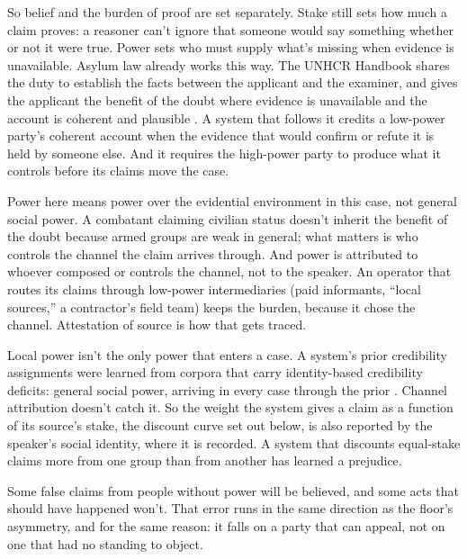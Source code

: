 So belief and the burden of proof are set separately. Stake still sets how much a claim proves: a reasoner can't ignore that someone would say something whether or not it were true. Power sets who must supply what's missing when evidence is unavailable. Asylum law already works this way. The UNHCR Handbook shares the duty to establish the facts between the applicant and the examiner, and gives the applicant the benefit of the doubt where evidence is unavailable and the account is coherent and plausible \autocite{unhcr1979handbook}. A system that follows it credits a low-power party's coherent account when the evidence that would confirm or refute it is held by someone else. And it requires the high-power party to produce what it controls before its claims move the case.

Power here means power over the evidential environment in this case, not general social power. A combatant claiming civilian status doesn't inherit the benefit of the doubt because armed groups are weak in general; what matters is who controls the channel the claim arrives through. And power is attributed to whoever composed or controls the channel, not to the speaker. An operator that routes its claims through low-power intermediaries (paid informants, “local sources,” a contractor's field team) keeps the burden, because it chose the channel. Attestation of source is how that gets traced.

Local power isn't the only power that enters a case. A system's prior credibility assignments were learned from corpora that carry identity-based credibility deficits: general social power, arriving in every case through the prior \autocite{fricker2007epistemic}. Channel attribution doesn't catch it. So the weight the system gives a claim as a function of its source's stake, the discount curve set out below, is also reported by the speaker's social identity, where it is recorded. A system that discounts equal-stake claims more from one group than from another has learned a prejudice.

Some false claims from people without power will be believed, and some acts that should have happened won't. That error runs in the same direction as the floor's asymmetry, and for the same reason: it falls on a party that can appeal, not on one that had no standing to object.


